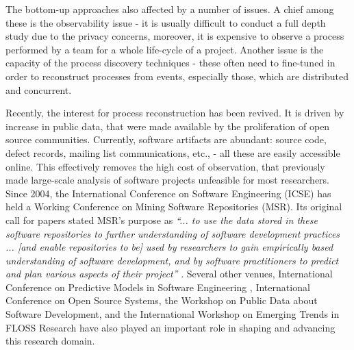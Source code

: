 The bottom-up approaches also affected by a number of issues. A chief among these is the observability
issue - it is usually difficult to conduct a full depth study due to the privacy concerns, moreover, it is expensive
to observe a process performed by a team for a whole life-cycle of a project. 
Another issue is the capacity of the process discovery techniques - these often need to fine-tuned in order to
reconstruct processes from events, especially those, which are distributed and concurrent. 

Recently, the interest for process reconstruction has been revived. It is driven by increase in public data, that were
made available by the proliferation of open source communities. Currently, software artifacts are abundant: source
code, defect records, mailing list communications, etc., - all these are easily accessible online. This effectively
removes the high cost of observation, that previously made large-scale analysis of software projects unfeasible 
for most researchers. Since 2004, the International Conference on Software Engineering (ICSE) has 
held a Working Conference on Mining Software Repositories (MSR). 
Its original call for papers stated MSR's purpose as \textit{``... to use the data stored in these 
software repositories to further understanding of software development practices ... 
[and enable repositories to be] 
used by researchers to gain empirically based understanding of software development, 
and by software practitioners to predict and plan various aspects of their project''}
\cite{msr2004} \cite{citeulike:7853299}. 
Several other venues, International Conference on Predictive Models in Software Engineering \cite{promise12}, 
International Conference on Open Source Systems, 
the Workshop on Public Data about Software Development, 
and the International Workshop on Emerging Trends in FLOSS Research have also played
an important role in shaping and advancing this research domain.

